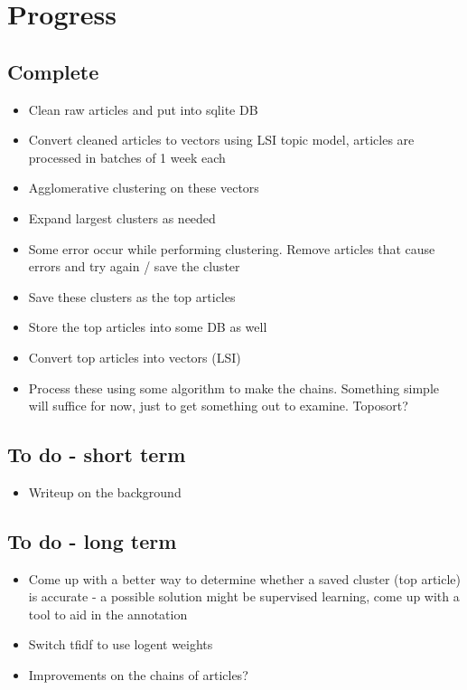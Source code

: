 \documentclass[12pt]{article}
\begin{document}
\section{Progress}

\subsection{Complete}
\begin{itemize}[noitemsep]
\item{Clean raw articles and put into sqlite DB}
\item{Convert cleaned articles to vectors using LSI topic model, articles are processed in batches of 1 week each}
\item{Agglomerative clustering on these vectors}
\item{Expand largest clusters as needed}
\item{Some error occur while performing clustering. Remove articles that cause errors and try again / save the cluster}
\item{Save these clusters as the top articles}
\item{Store the top articles into some DB as well}
\item{Convert top articles into vectors (LSI)}
\item{Process these using some algorithm to make the chains. Something simple will suffice for now, just to get something out to examine. Toposort?}
\end{itemize}

\subsection{To do - short term}
\begin{itemize}[noitemsep]
\item{Writeup on the background}
\end{itemize}

\subsection{To do - long term}
\begin{itemize}[noitemsep]
\item{Come up with a better way to determine whether a saved cluster (top article) is accurate - a possible solution might be supervised learning, come up with a tool to aid in the annotation}
\item{Switch tfidf to use logent weights}
\item{Improvements on the chains of articles?}
\end{itemize}
\end{document}
